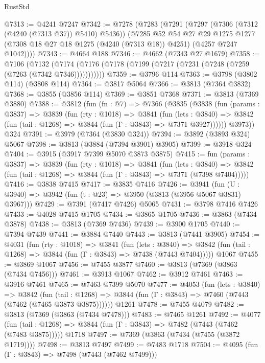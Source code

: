 \begin{lexlean}{RustStd}
\begin{coremodule}
@7313 := @4241 @7247
@7342 := @7278
    (@7283
      (@7291
        (@7297 (@7306 (@7312 (@4240 (@7313 @37)) @5410) @5436))
        (@7285
          @52
          @54
          @27
          @29
          @1275
          @1277
          (@7308 @18 @27 @18 @1275 (@4240 (@7313 @18)) @4251)
          (@4257 @7247 @1042))))
@7343 := @4664 @188
@7346 := @4662 (@7343 @27 @1679)
@7358 := @7106
    (@7132 (@7174 (@7176 (@7178 (@7199 (@7217 (@7231 (@7248 (@7259 (@7263 (@7342 @7346)))))))))))
@7359 := @3796 @114
@7363 := @3798 (@3802 @114) (@3808 @114)
@7364 := @3817 @5064
@7366 := @3813 (@7364 @3832)
@7368 := @3855 (@3856 @114)
@7369 := @3851 @7368
@7371 := @3813 (@7369 @3880)
@7388 := @3812
    (fun (fn : @7) =>
    @7366
      (@3835
        (@3838
          (fun (params : @3837) =>
          @3839
            (fun (rty : @1018) =>
            @3841
              (fun (lets : @3840) =>
              @3842 (fun (tail : @1268) => @3844 (fun (Γ : @3843) => @7371 @3927))))))
        @3973))
    @324
@7391 := @3979 (@7364 (@3830 @324))
@7394 := @3892 (@3893 @324) @5067
@7398 := @3813 (@3884 (@7394 @3901) @3905)
@7399 := @3918 @324
@7404 := @3915 (@3917 @7399 @5070 @3873 @3875)
@7415 := fun (params : @3837) =>
  @3839
    (fun (rty : @1018) =>
    @3841
      (fun (lets : @3840) =>
      @3842 (fun (tail : @1268) => @3844 (fun (Γ : @3843) => @7371 (@7398 @7404)))))
@7416 := @3838 @7415
@7417 := @3835 @7416
@7426 := @3941 (fun (U : @3940) => @3942 (fun (t : @23) => @3950 (@3813 (@3956 @5067 @3831) @3967)))
@7429 := @7391 (@7417 @7426) @5065
@7431 := @3798 @7416 @7426
@7433 := @4028 @7415 @1705
@7434 := @3865 @1705
@7436 := @3863 (@7434 @3878)
@7438 := @3813 (@7369 @7436)
@7439 := @3900 @1705
@7440 := @7394 @7439
@7441 := @3884 @7440
@7443 := @3813 (@7441 @3905)
@7454 := @4031
    (fun (rty : @1018) =>
    @3841
      (fun (lets : @3840) =>
      @3842 (fun (tail : @1268) => @3844 (fun (Γ : @3843) => @7438 (@7443 @7404)))))
    @1067
@7455 := @3869 @1067
@7456 := @7455 @3877
@7460 := @3813 (@7369 (@3863 (@7434 @7456)))
@7461 := @3913 @1067
@7462 := @3912 @7461
@7463 := @3916 @7461
@7465 := @7463 @7399 @5070
@7477 := @4053
    (fun (lets : @3840) =>
    @3842
      (fun (tail : @1268) => @3844 (fun (Γ : @3843) => @7460 (@7443 (@7462 (@7465 @3873 @3875))))))
    @1261
@7478 := @7455 @4079
@7482 := @3813 (@7369 (@3863 (@7434 @7478)))
@7483 := @7465 @1261
@7492 := @4077
    (fun (tail : @1268) => @3844 (fun (Γ : @3843) => @7482 (@7443 (@7462 (@7483 @3875)))))
    @1718
@7497 := @7369 (@3863 (@7434 (@7455 (@3872 @1719))))
@7498 := @3813 @7497
@7499 := @7483 @1718
@7504 := @4095 (fun (Γ : @3843) => @7498 (@7443 (@7462 @7499)))

\end{coremodule}
\end{lexlean}
